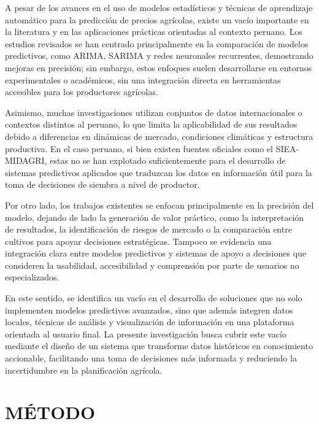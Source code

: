 \documentclass[12pt, a4paper]{report}
\begin{document}
A pesar de los avances en el uso de modelos estadísticos y técnicas de aprendizaje automático para la predicción de precios agrícolas, existe un vacío importante en la literatura y en las aplicaciones prácticas orientadas al contexto peruano. Los estudios revisados se han centrado principalmente en la comparación de modelos predictivos, como ARIMA, SARIMA y redes neuronales recurrentes, demostrando mejoras en precisión; sin embargo, estos enfoques suelen desarrollarse en entornos experimentales o académicos, sin una integración directa en herramientas accesibles para los productores agrícolas.

Asimismo, muchas investigaciones utilizan conjuntos de datos internacionales o contextos distintos al peruano, lo que limita la aplicabilidad de sus resultados debido a diferencias en dinámicas de mercado, condiciones climáticas y estructura productiva. En el caso peruano, si bien existen fuentes oficiales como el SIEA-MIDAGRI, estas no se han explotado suficientemente para el desarrollo de sistemas predictivos aplicados que traduzcan los datos en información útil para la toma de decisiones de siembra a nivel de productor.

Por otro lado, los trabajos existentes se enfocan principalmente en la precisión del modelo, dejando de lado la generación de valor práctico, como la interpretación de resultados, la identificación de riesgos de mercado o la comparación entre cultivos para apoyar decisiones estratégicas. Tampoco se evidencia una integración clara entre modelos predictivos y sistemas de apoyo a decisiones que consideren la usabilidad, accesibilidad y comprensión por parte de usuarios no especializados.

En este sentido, se identifica un vacío en el desarrollo de soluciones que no solo implementen modelos predictivos avanzados, sino que además integren datos locales, técnicas de análisis y visualización de información en una plataforma orientada al usuario final. La presente investigación busca cubrir este vacío mediante el diseño de un sistema que transforme datos históricos en conocimiento accionable, facilitando una toma de decisiones más informada y reduciendo la incertidumbre en la planificación agrícola.



\chapter{MÉTODO}
\end{document}
